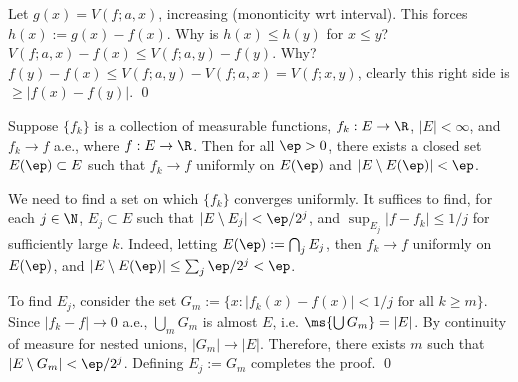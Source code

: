 \pf Let $g(x)= V(f; a,x)$, increasing (mononticity wrt interval). This forces $h(x):= g(x) - f(x)$. Why is $h(x) \leq h(y)$ for $x \leq y$? $V(f;a,x) - f(x) \leq V(f; a,y) - f(y)$. Why? $f(y)-f(x) \leq V(f; a,y) - V(f; a,x)= V(f;x,y)$, clearly this right side is $ \geq |f(x)-f(y)|$. \qed \\



































\begin{thm}
Suppose $\{f_k\}$ is a collection of measurable functions, $f_k: E \to \R$, $|E|<\infty$, and $f_k \to f$ a.e., where $f: E \to \R$. Then for all $\ep>0$, there exists a closed set $E(\ep) \subset E$ such that $f_k \to f$ uniformly on $E(\ep)$ and $|E \setminus E(\ep)|<\ep$. 
\end{thm}

\pf We need to find a set on which $\{f_k\}$ converges uniformly. It suffices to find, for each $j \in \N$, $E_j \subset E$ such that $|E \setminus E_j|< \ep/2^j$, and $\sup_{E_j} |f-f_k| \leq 1/j$ for sufficiently large $k$. Indeed, letting $E(\ep):= \bigcap_j E_j$, then $f_k \to f$ uniformly on $E(\ep)$, and $|E \setminus E(\ep)| \leq \sum_j \ep/2^j<\ep$. 

To find $E_j$, consider the set $G_m:=\{ x \colon |f_k(x)-f(x)| <1/j \text{ for all } k \geq m\}$. Since $|f_k-f| \to 0$ a.e., $\bigcup_m G_m$ is almost $E$, i.e. $\ms{\bigcup G_m}= |E|$. By continuity of measure for nested unions, $|G_m| \to |E|$. Therefore, there exists $m$ such that $|E \setminus G_m|< \ep/2^j$. Defining $E_j:= G_m$ completes the proof. \qed \\


